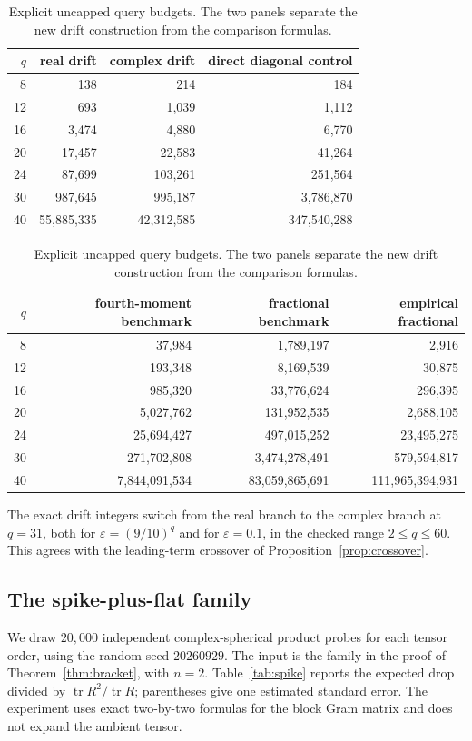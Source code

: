 \documentclass[11pt,a4paper]{article}
\theoremstyle{definition}\newtheorem{definition}[theorem]{Definition}
\theoremstyle{remark}\newtheorem{remark}[theorem]{Remark}
\numberwithin{equation}{section}
\newcommand{\tr}{\operatorname{tr}}
\newcommand{\eps}{\varepsilon}
\begin{document}
\begin{table}[ht]
\centering
\begin{tabular}{@{}rrrr@{}}
\toprule
\(q\) & real drift & complex drift & direct diagonal control\\
\midrule
8 & 138 & 214 & 184\\
12 & 693 & 1,039 & 1,112\\
16 & 3,474 & 4,880 & 6,770\\
20 & 17,457 & 22,583 & 41,264\\
24 & 87,699 & 103,261 & 251,564\\
30 & 987,645 & 995,187 & 3,786,870\\
40 & 55,885,335 & 42,312,585 & 347,540,288\\
\bottomrule
\end{tabular}

\medskip
\begin{tabular}{@{}rrrr@{}}
\toprule
\(q\) & fourth-moment benchmark & fractional benchmark & empirical fractional\\
\midrule
8 & 37,984 & 1,789,197 & 2,916\\
12 & 193,348 & 8,169,539 & 30,875\\
16 & 985,320 & 33,776,624 & 296,395\\
20 & 5,027,762 & 131,952,535 & 2,688,105\\
24 & 25,694,427 & 497,015,252 & 23,495,275\\
30 & 271,702,808 & 3,474,278,491 & 579,594,817\\
40 & 7,844,091,534 & 83,059,865,691 & 111,965,394,931\\
\bottomrule
\end{tabular}
\caption{Explicit uncapped query budgets. The two panels separate the new
drift construction from the comparison formulas.}
\label{tab:budgets}
\end{table}
The exact drift integers switch from the real branch to the complex branch
at \(q=31\), both for \(\eps=(9/10)^q\) and for \(\eps=0.1\), in the checked
range \(2\le q\le60\). This agrees with the leading-term crossover of
Proposition~\ref{prop:crossover}.

\subsection{The spike-plus-flat family}
We draw \(20{,}000\) independent complex-spherical product probes for each
tensor order, using the random seed \(20260929\). The input is the family
in the proof of Theorem~\ref{thm:bracket}, with \(n=2\).
Table~\ref{tab:spike} reports the expected drop divided by
\(\tr R^2/\tr R\); parentheses give one estimated standard error.
The experiment uses exact two-by-two formulas for the block Gram matrix
and does not expand the ambient tensor.
\end{document}
